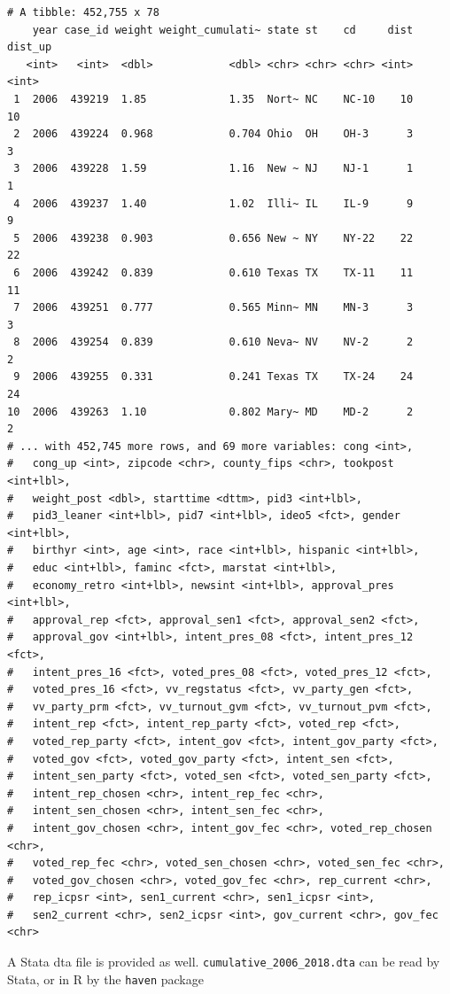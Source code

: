 \documentclass[10pt,article,oneside]{memoir}
\theoremstyle{definition}
\begin{document}
\begin{verbatim}
# A tibble: 452,755 x 78
    year case_id weight weight_cumulati~ state st    cd     dist dist_up
   <int>   <int>  <dbl>            <dbl> <chr> <chr> <chr> <int>   <int>
 1  2006  439219  1.85             1.35  Nort~ NC    NC-10    10      10
 2  2006  439224  0.968            0.704 Ohio  OH    OH-3      3       3
 3  2006  439228  1.59             1.16  New ~ NJ    NJ-1      1       1
 4  2006  439237  1.40             1.02  Illi~ IL    IL-9      9       9
 5  2006  439238  0.903            0.656 New ~ NY    NY-22    22      22
 6  2006  439242  0.839            0.610 Texas TX    TX-11    11      11
 7  2006  439251  0.777            0.565 Minn~ MN    MN-3      3       3
 8  2006  439254  0.839            0.610 Neva~ NV    NV-2      2       2
 9  2006  439255  0.331            0.241 Texas TX    TX-24    24      24
10  2006  439263  1.10             0.802 Mary~ MD    MD-2      2       2
# ... with 452,745 more rows, and 69 more variables: cong <int>,
#   cong_up <int>, zipcode <chr>, county_fips <chr>, tookpost <int+lbl>,
#   weight_post <dbl>, starttime <dttm>, pid3 <int+lbl>,
#   pid3_leaner <int+lbl>, pid7 <int+lbl>, ideo5 <fct>, gender <int+lbl>,
#   birthyr <int>, age <int>, race <int+lbl>, hispanic <int+lbl>,
#   educ <int+lbl>, faminc <fct>, marstat <int+lbl>,
#   economy_retro <int+lbl>, newsint <int+lbl>, approval_pres <int+lbl>,
#   approval_rep <fct>, approval_sen1 <fct>, approval_sen2 <fct>,
#   approval_gov <int+lbl>, intent_pres_08 <fct>, intent_pres_12 <fct>,
#   intent_pres_16 <fct>, voted_pres_08 <fct>, voted_pres_12 <fct>,
#   voted_pres_16 <fct>, vv_regstatus <fct>, vv_party_gen <fct>,
#   vv_party_prm <fct>, vv_turnout_gvm <fct>, vv_turnout_pvm <fct>,
#   intent_rep <fct>, intent_rep_party <fct>, voted_rep <fct>,
#   voted_rep_party <fct>, intent_gov <fct>, intent_gov_party <fct>,
#   voted_gov <fct>, voted_gov_party <fct>, intent_sen <fct>,
#   intent_sen_party <fct>, voted_sen <fct>, voted_sen_party <fct>,
#   intent_rep_chosen <chr>, intent_rep_fec <chr>,
#   intent_sen_chosen <chr>, intent_sen_fec <chr>,
#   intent_gov_chosen <chr>, intent_gov_fec <chr>, voted_rep_chosen <chr>,
#   voted_rep_fec <chr>, voted_sen_chosen <chr>, voted_sen_fec <chr>,
#   voted_gov_chosen <chr>, voted_gov_fec <chr>, rep_current <chr>,
#   rep_icpsr <int>, sen1_current <chr>, sen1_icpsr <int>,
#   sen2_current <chr>, sen2_icpsr <int>, gov_current <chr>, gov_fec <chr>
\end{verbatim}

A Stata dta file is provided as well.
\texttt{cumulative\_2006\_2018.dta} can be read by Stata, or in R by the
\texttt{haven} package
\end{document}

